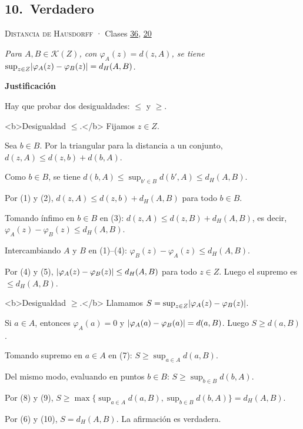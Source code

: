 \documentclass[11pt,a4paper]{article}
\newcommand{\bloque}[1]{\par\smallskip\noindent\textbf{\color{acento}#1}\par}
\begin{document}
\subsection*{\hypertarget{r-10}{}10.\ \textcolor{ok}{Verdadero}}
{\small \textsc{Distancia de Hausdorff} · Clases \href{https://decostruttivismo.github.io/MAT2514-repaso/pdf/MAT2514_apuntes_completos.pdf\#nameddest=section.36}{36}, \href{https://decostruttivismo.github.io/MAT2514-repaso/pdf/MAT2514_apuntes_completos.pdf\#nameddest=section.20}{20}}\par
\emph{Para $A,B\in\mathcal K(Z)$, con $\varphi_A(z)=d(z,A)$, se tiene $\sup_{z\in Z}\lvert \varphi_A(z)-\varphi_B(z)\rvert=d_H(A,B)$.}
\bloque{Justificación}
\begin{pasos}
\item[] Hay que probar dos desigualdades: \guillemotleft{}$\le$\guillemotright{} y \guillemotleft{}$\ge$\guillemotright{}.
\item[] <b>Desigualdad \guillemotleft{}$\le$\guillemotright{}.</b> Fijamos $z\in Z$.
\item[(1)] Sea $b\in B$. Por la triangular para la distancia a un conjunto, $d(z,A)\le d(z,b)+d(b,A)$.
\item[(2)] Como $b\in B$, se tiene $d(b,A)\le\sup_{b'\in B}d(b',A)\le d_H(A,B)$.
\item[(3)] Por (1) y (2), $d(z,A)\le d(z,b)+d_H(A,B)$ para todo $b\in B$.
\item[(4)] Tomando ínfimo en $b\in B$ en (3): $d(z,A)\le d(z,B)+d_H(A,B)$, es decir, $\varphi_A(z)-\varphi_B(z)\le d_H(A,B)$.
\item[(5)] Intercambiando $A$ y $B$ en (1)–(4): $\varphi_B(z)-\varphi_A(z)\le d_H(A,B)$.
\item[(6)] Por (4) y (5), $\lvert \varphi_A(z)-\varphi_B(z)\rvert\le d_H(A,B)$ para todo $z\in Z$. Luego el supremo es $\le d_H(A,B)$.
\item[] <b>Desigualdad \guillemotleft{}$\ge$\guillemotright{}.</b> Llamamos $S=\sup_{z\in Z}\lvert \varphi_A(z)-\varphi_B(z)\rvert$.
\item[(7)] Si $a\in A$, entonces $\varphi_A(a)=0$ y $\lvert \varphi_A(a)-\varphi_B(a)\rvert=d(a,B)$. Luego $S\ge d(a,B)$.
\item[(8)] Tomando supremo en $a\in A$ en (7): $S\ge\sup_{a\in A}d(a,B)$.
\item[(9)] Del mismo modo, evaluando en puntos $b\in B$: $S\ge\sup_{b\in B}d(b,A)$.
\item[(10)] Por (8) y (9), $S\ge\max\{\sup_{a\in A}d(a,B),\sup_{b\in B}d(b,A)\}=d_H(A,B)$.
\item[] Por (6) y (10), $S=d_H(A,B)$. La afirmación es verdadera.
\end{pasos}
\end{document}
